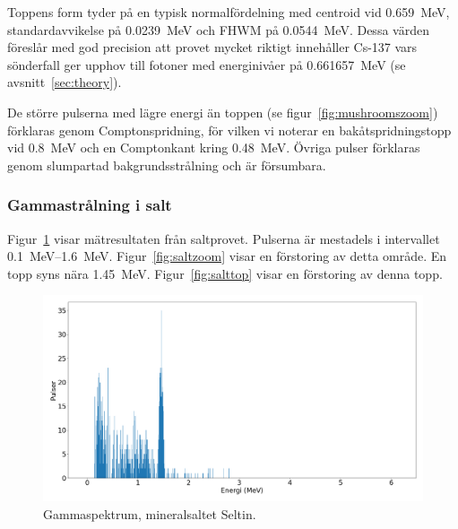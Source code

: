 Toppens form tyder på en typisk normalfördelning med centroid vid
\qty{0.659}{\MeV}, standardavvikelse på \qty{0.0239}{\MeV} och FHWM på
\qty{0.0544}{\MeV}. Dessa värden föreslår med god precision att provet mycket
riktigt innehåller Cs-137 vars sönderfall ger upphov till fotoner med
energinivåer på \qty{0.661657}{\MeV} (se avsnitt~\ref{sec:theory}).

De större pulserna med lägre energi än toppen (se
figur~\ref{fig:mushroomszoom}) förklaras genom Comptonspridning, för vilken
vi noterar en bakåtspridningstopp vid \qty{0.8}{\MeV} och en Comptonkant kring
\qty{0.48}{\MeV}. Övriga pulser förklaras genom slumpartad bakgrundsstrålning
och är försumbara.

\subsubsection{Gammastrålning i salt}

Figur~\ref{fig:salt} visar mätresultaten från saltprovet. Pulserna är
mestadels i intervallet \qtyrange{0.1}{1.6}{\MeV}. Figur~\ref{fig:saltzoom}
visar en förstoring av detta område. En topp syns nära \qty{1.45}{\MeV}.
Figur~\ref{fig:salttop} visar en förstoring av denna topp.

\begin{figure}[!ht]
    \centering
    \includegraphics[width=\textwidth, keepaspectratio]{../images/salt.png}
    \caption{Gammaspektrum, mineralsaltet Seltin.}
    \label{fig:salt}
\end{figure}

